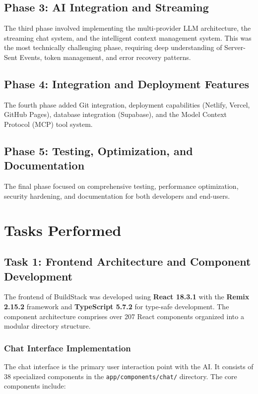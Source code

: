\documentclass[12pt,a4paper,openany]{report}
\begin{document}
\subsection{Phase 3: AI Integration and Streaming}
The third phase involved implementing the multi-provider LLM architecture, the streaming chat system, and the intelligent context management system. This was the most technically challenging phase, requiring deep understanding of Server-Sent Events, token management, and error recovery patterns.

\subsection{Phase 4: Integration and Deployment Features}
The fourth phase added Git integration, deployment capabilities (Netlify, Vercel, GitHub Pages), database integration (Supabase), and the Model Context Protocol (MCP) tool system.

\subsection{Phase 5: Testing, Optimization, and Documentation}
The final phase focused on comprehensive testing, performance optimization, security hardening, and documentation for both developers and end-users.

\section{Tasks Performed}

\subsection{Task 1: Frontend Architecture and Component Development}

The frontend of BuildStack was developed using \textbf{React 18.3.1} with the \textbf{Remix 2.15.2} framework and \textbf{TypeScript 5.7.2} for type-safe development. The component architecture comprises over 207 React components organized into a modular directory structure.

\subsubsection{Chat Interface Implementation}
The chat interface is the primary user interaction point with the AI. It consists of 38 specialized components in the \texttt{app/components/chat/} directory. The core components include:
\end{document}
